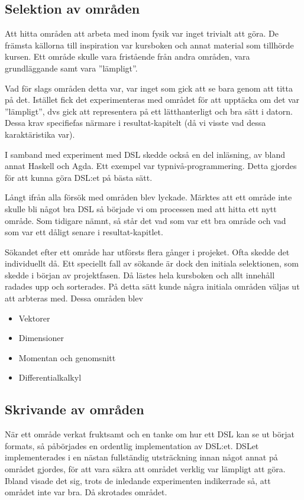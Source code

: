 \begin{draft}

\subsection{Selektion av områden}

Att hitta områden att arbeta med inom fysik var inget trivialt att göra. De främsta källorna till inspiration var kursboken och annat material som tillhörde kursen. Ett område skulle vara fristående från andra områden, vara grundläggande samt vara ''lämpligt''.

Vad för slags områden detta var, var inget som gick att se bara genom att titta på det. Istället fick det experimenteras med området för att upptäcka om det var ''lämpligt'', dvs gick att representera på ett lätthanterligt och bra sätt i datorn. Dessa krav specifiefas närmare i resultat-kapitelt (då vi visste vad dessa karaktäristika var).

I samband med experiment med DSL skedde också en del inläsning, av bland annat Haskell och Agda. Ett exempel var typnivå-programmering. Detta gjordes för att kunna göra DSL:et på bästa sätt.

Långt ifrån alla försök med områden blev lyckade. Märktes att ett område inte skulle bli något bra DSL så började vi om processen med att hitta ett nytt område. Som tidigare nämnt, så står det vad som var ett bra område och vad som var ett dåligt senare i resultat-kapitlet.

Sökandet efter ett område har utförsts flera gånger i projeket. Ofta skedde det individuellt då. Ett speciellt fall av sökande är dock den initiala selektionen, som skedde i början av projektfasen. Då lästes hela kursboken och allt innehåll radades upp och sorterades. På detta sätt kunde några initiala områden väljas ut att arbteras med. Dessa områden blev

\begin{itemize}
  \item Vektorer
  \item Dimensioner
  \item Momentan och genomsnitt
  \item Differentialkalkyl
\end{itemize}

\subsection{Skrivande av områden}

När ett område verkat fruktsamt och en tanke om hur ett DSL kan se ut börjat formats, så påbörjades en ordentlig implementation av DSL:et. DSLet implementerades i en nästan fullständig utsträckning innan något annat på området gjordes, för att vara säkra att området verklig var lämpligt att göra. Ibland visade det sig, trots de inledande experimenten indikerrade så, att området inte var bra. Då skrotades området.


\end{draft}
